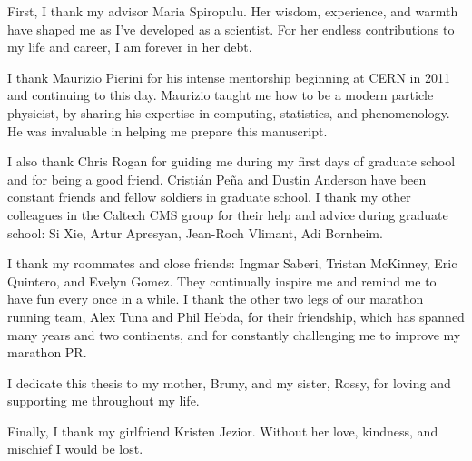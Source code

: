 \begin{acknowledgments}     %
                                                                                                         
First, I thank my advisor Maria Spiropulu. Her
wisdom, experience, and warmth have shaped me as I've
developed as a scientist. For her endless contributions to my life
and career, I am forever in her debt.

I thank Maurizio Pierini for his intense mentorship beginning at CERN
in 2011 and continuing to this day. Maurizio taught me how to be a
modern particle
physicist, by sharing his expertise in computing, statistics, and
phenomenology. He was invaluable in helping me prepare this manuscript.

I also thank Chris Rogan for guiding me during my first days of
graduate school and for being a good friend. Cristi\'{a}n Pe\~{n}a and
Dustin Anderson have been constant friends and fellow soldiers in
graduate school. I thank my other colleagues in the Caltech CMS group
for their help and advice during graduate school: Si Xie, Artur Apresyan, Jean-Roch Vlimant, Adi Bornheim.

I thank my roommates and close friends: Ingmar Saberi, Tristan McKinney,
Eric Quintero, and Evelyn Gomez. They continually inspire me and
remind me to have fun every once in a while. 
I thank the other two legs of our marathon running team, Alex Tuna and Phil Hebda, for their friendship,
which has spanned many years and two continents, and for constantly challenging
me to improve my marathon PR.

I dedicate this thesis to my mother, Bruny, and my sister, Rossy, for
loving and supporting me throughout my life.

Finally, I thank my girlfriend Kristen Jezior. Without her love,
kindness, and mischief I would be lost.

\end{acknowledgments}